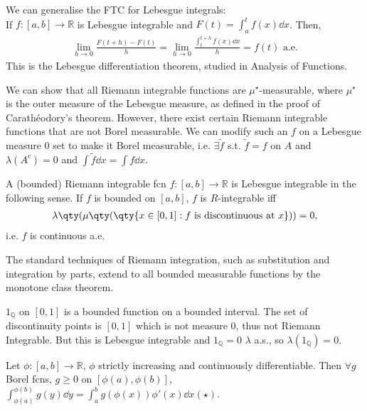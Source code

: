 \begin{remark}
	We can generalise the FTC for Lebesgue integrals: \\
	If $f : [a, b] \to \mathbb{R}$ is Lebesgue integrable and $F(t) = \int_{a}^{t} f(x) \dd{x}$.
	Then,
	\begin{align*}
		\lim_{h \to 0} \frac{F(t+h) - F(t)}{h} = \lim_{h \to 0} \frac{\int_{t}^{t + h} f(x) \dd{x}}{h} = f(t) \text{ a.e.}
	\end{align*}
	This is the Lebesgue differentiation theorem, studied in Analysis of Functions.
\end{remark}

\begin{remark}
	We can show that all Riemann integrable functions are $\mu^\star$-measurable, where $\mu^\star$ is the outer measure of the Lebesgue measure, as defined in the proof of Carath\'eodory's theorem.
	However, there exist certain Riemann integrable functions that are not Borel measurable.
	We can modify such an $f$ on a Lebesgue measure $0$ set to make it Borel measurable, i.e. $\exists \widetilde f$ s.t. $\widetilde{f} = f$ on $A$ and $\lambda(A^c) = 0$ and $\int \widetilde{f} \dd{x} = \int f \dd{x}$.

	A (bounded) Riemann integrable fcn $f : [a, b] \to \mathbb{R}$ is Lebesgue integrable in the following sense.
	If $f$ is bounded on $[a, b]$, $f$ is $R$-integrable iff
	\begin{align*}
		\lambda\qty(\mu\qty(\qty{x \in [0,1] : f \text{ is discontinuous at } x})) = 0,
	\end{align*} i.e. $f$ is continuous a.e.

	The standard techniques of Riemann integration, such as substitution and integration by parts, extend to all bounded measurable functions by the monotone class theorem.
\end{remark}

\begin{example}
	$1_\mathbb{Q}$ on $[0, 1]$ is a bounded function on a bounded interval.
	The set of discontinuity points is $[0, 1]$ which is not measure $0$, thus not Riemann Integrable.
	But this is Lebesgue integrable and $1_\mathbb{Q} = 0$ $\lambda$ a.s., so $\lambda(1_\mathbb{Q}) = 0$.
\end{example}

\begin{theorem}
	Let $\phi : [a, b] \to \mathbb{R}$, $\phi$ strictly increasing and continuously differentiable.
	Then $\forall g$ Borel fcns, $g \geq 0$ on $[\phi(a), \phi(b)]$, $\int_{\phi(a)}^{\phi(b)} g(y) \dd{y} = \int_a^b g(\phi(x)) \phi'(x) \dd{x} (\star)$.
\end{theorem}

